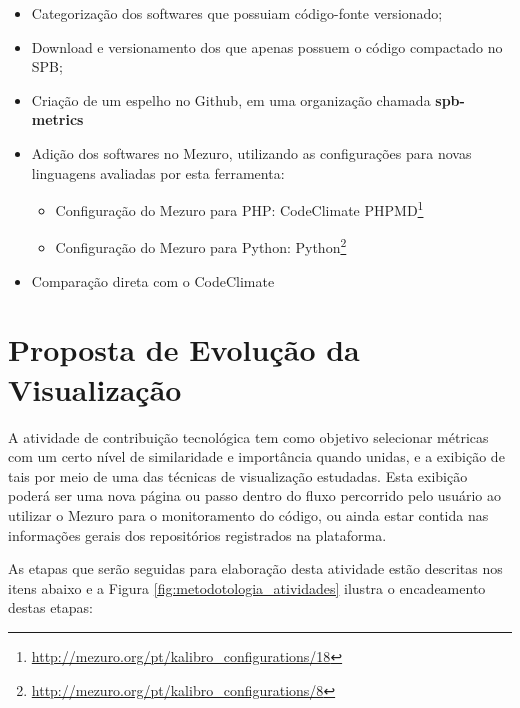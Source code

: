 \begin{itemize}
  \item Categorização dos softwares que possuiam código-fonte versionado;
  \item Download e versionamento dos que apenas possuem o código compactado no SPB;
  \item Criação de um espelho no Github, em uma organização chamada \textbf{spb-metrics}
  \item Adição dos softwares no Mezuro, utilizando as configurações para novas
  linguagens avaliadas por esta ferramenta:
    \begin{itemize}
        \item Configuração do Mezuro para PHP: CodeClimate
              PHPMD\footnote{\url{http://mezuro.org/pt/kalibro\_configurations/18}}
      \item Configuração do Mezuro para Python:
              Python\footnote{\url{http://mezuro.org/pt/kalibro\_configurations/8}}
    \end{itemize}
  \item Comparação direta com o CodeClimate
\end{itemize}

\section{Proposta de Evolução da Visualização}

A atividade de contribuição tecnológica tem como objetivo selecionar métricas
com um certo nível  de similaridade e importância quando unidas, e a exibição de
tais por meio de uma das técnicas de visualização estudadas. Esta exibição
poderá ser uma nova página ou passo dentro do fluxo percorrido pelo usuário ao
utilizar o Mezuro para o monitoramento do código, ou ainda estar contida nas
informações gerais dos repositórios registrados na plataforma.

As etapas que serão seguidas para elaboração desta atividade estão descritas
nos itens abaixo e a Figura \ref{fig:metodotologia_atividades} ilustra o
encadeamento destas etapas:

